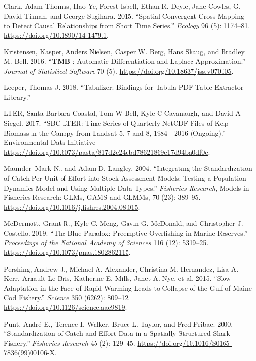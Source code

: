 \documentclass[]{article}
\begin{document}
\leavevmode\hypertarget{ref-clark2015}{}%
Clark, Adam Thomas, Hao Ye, Forest Isbell, Ethan R. Deyle, Jane Cowles, G. David Tilman, and George Sugihara. 2015. ``Spatial Convergent Cross Mapping to Detect Causal Relationships from Short Time Series.'' \emph{Ecology} 96 (5): 1174--81. \url{https://doi.org/10.1890/14-1479.1}.

\leavevmode\hypertarget{ref-kristensen2016}{}%
Kristensen, Kasper, Anders Nielsen, Casper W. Berg, Hans Skaug, and Bradley M. Bell. 2016. ``\textbf{TMB} : Automatic Differentiation and Laplace Approximation.'' \emph{Journal of Statistical Software} 70 (5). \url{https://doi.org/10.18637/jss.v070.i05}.

\leavevmode\hypertarget{ref-leeper2018}{}%
Leeper, Thomas J. 2018. ``Tabulizer: Bindings for Tabula PDF Table Extractor Library.''

\leavevmode\hypertarget{ref-lter2017}{}%
LTER, Santa Barbara Coastal, Tom W Bell, Kyle C Cavanaugh, and David A Siegel. 2017. ``SBC LTER: Time Series of Quarterly NetCDF Files of Kelp Biomass in the Canopy from Landsat 5, 7 and 8, 1984 - 2016 (Ongoing).'' Environmental Data Initiative. \url{https://doi.org/10.6073/pasta/817d2c24ebd78621869e17d94ba0df0c}.

\leavevmode\hypertarget{ref-maunder2004}{}%
Maunder, Mark N., and Adam D. Langley. 2004. ``Integrating the Standardization of Catch-Per-Unit-of-Effort into Stock Assessment Models: Testing a Population Dynamics Model and Using Multiple Data Types.'' \emph{Fisheries Research}, Models in Fisheries Research: GLMs, GAMS and GLMMs, 70 (23): 389--95. \url{https://doi.org/10.1016/j.fishres.2004.08.015}.

\leavevmode\hypertarget{ref-mcdermott2019}{}%
McDermott, Grant R., Kyle C. Meng, Gavin G. McDonald, and Christopher J. Costello. 2019. ``The Blue Paradox: Preemptive Overfishing in Marine Reserves.'' \emph{Proceedings of the National Academy of Sciences} 116 (12): 5319--25. \url{https://doi.org/10.1073/pnas.1802862115}.

\leavevmode\hypertarget{ref-pershing2015a}{}%
Pershing, Andrew J., Michael A. Alexander, Christina M. Hernandez, Lisa A. Kerr, Arnault Le Bris, Katherine E. Mills, Janet A. Nye, et al. 2015. ``Slow Adaptation in the Face of Rapid Warming Leads to Collapse of the Gulf of Maine Cod Fishery.'' \emph{Science} 350 (6262): 809--12. \url{https://doi.org/10.1126/science.aac9819}.

\leavevmode\hypertarget{ref-punt2000}{}%
Punt, André E., Terence I. Walker, Bruce L. Taylor, and Fred Pribac. 2000. ``Standardization of Catch and Effort Data in a Spatially-Structured Shark Fishery.'' \emph{Fisheries Research} 45 (2): 129--45. \url{https://doi.org/10.1016/S0165-7836(99)00106-X}.
\end{document}
